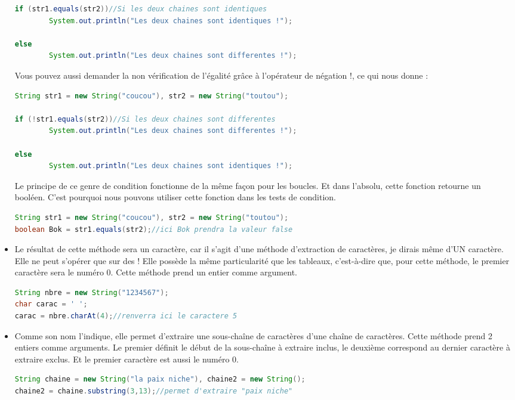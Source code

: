 \documentclass[a4paper,twoside]{article}
\begin{document}
\begin{itemize}
\begin{lstlisting}[language=java]
if (str1.equals(str2))//Si les deux chaines sont identiques
        System.out.println("Les deux chaines sont identiques !");
 
else
        System.out.println("Les deux chaines sont differentes !");
\end{lstlisting}


Vous pouvez aussi demander la non vérification de l'égalité grâce à l'opérateur de négation \og !\fg, ce qui nous donne :
\begin{lstlisting}[language=java]
String str1 = new String("coucou"), str2 = new String("toutou");
 
if (!str1.equals(str2))//Si les deux chaines sont differentes
        System.out.println("Les deux chaines sont differentes !");
 
else
        System.out.println("Les deux chaines sont identiques !");
\end{lstlisting}

Le principe de ce genre de condition fonctionne de la même façon pour les boucles. Et dans l'absolu, cette fonction retourne un booléen. C'est pourquoi nous pouvons utiliser cette fonction dans les tests de condition.
\begin{lstlisting}[language=java]
String str1 = new String("coucou"), str2 = new String("toutou");
boolean Bok = str1.equals(str2);//ici Bok prendra la valeur false
\end{lstlisting}

\item {}

Le résultat de cette méthode sera un caractère, car il s'agit d'une méthode d'extraction de caractères, je dirais même d'UN caractère. Elle ne peut s'opérer que sur des ! Elle possède la même particularité que les tableaux, c'est-à-dire que, pour cette méthode, le premier caractère sera le numéro 0. Cette méthode prend un entier comme argument.
\begin{lstlisting}[language=java]
String nbre = new String("1234567");
char carac = ' ';
carac = nbre.charAt(4);//renverra ici le caractere 5
\end{lstlisting}


\item {}

Comme son nom l'indique, elle permet d'extraire une sous-chaîne de caractères d'une chaîne de caractères. Cette méthode prend 2 entiers comme arguments. Le premier définit le début de la sous-chaîne à extraire inclus, le deuxième correspond au dernier caractère à extraire exclus. Et le premier caractère est aussi le numéro 0.
\begin{lstlisting}[language=java]
String chaine = new String("la paix niche"), chaine2 = new String();
chaine2 = chaine.substring(3,13);//permet d'extraire "paix niche"
\end{lstlisting}



\end{itemize}
\end{document}
